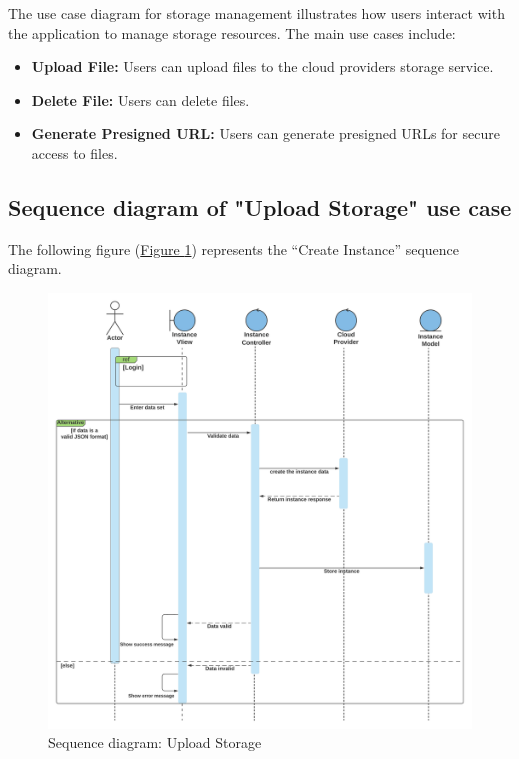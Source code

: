 The use case diagram for storage management illustrates how users interact with the application to manage storage resources. The main use cases include:

\begin{itemize}
  \item \textbf{Upload File:} Users can upload files to the cloud providers storage service.
  \item \textbf{Delete File:} Users can delete files.
  \item \textbf{Generate Presigned URL:} Users can generate presigned URLs for secure access to files.
\end{itemize}

\subsection{Sequence diagram of "Upload Storage" use case}

The following figure (\hyperref[fig:seq-instance]{Figure \ref{fig:seq-instance}})  represents the ``Create Instance'' sequence diagram.
\begin{figure}[h]
  \center
  \includegraphics[width=14cm]{./chapters/sprint2/seq-instance.png}
  \caption{Sequence diagram: Upload Storage}
  \label{fig:seq-instance}
\end{figure}

